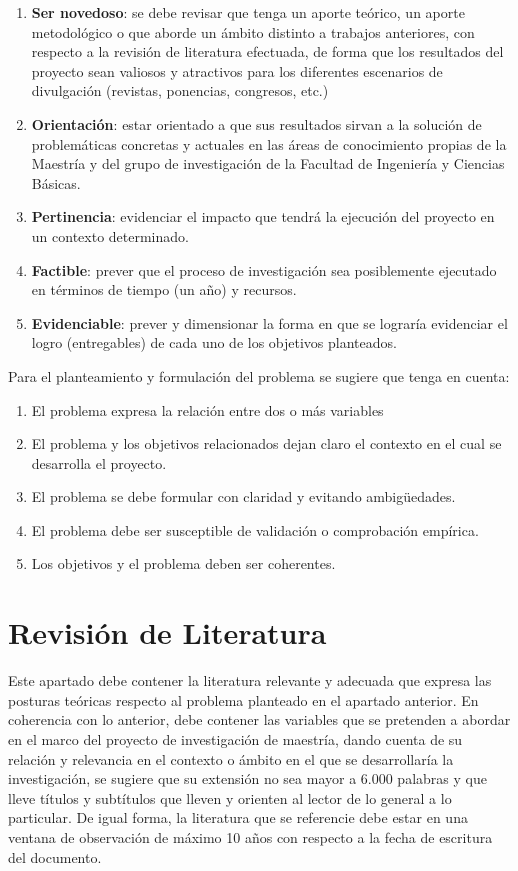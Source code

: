 \documentclass[spanish, 12pt, letterpaper]{poli}
\begin{document}
\begin{enumerate}
	\item \textbf{Ser novedoso}: se debe revisar que tenga un aporte teórico, un aporte metodológico o que aborde un ámbito distinto a trabajos anteriores, con respecto a la revisión de literatura efectuada, de forma que los resultados del proyecto sean valiosos y atractivos para los diferentes escenarios de divulgación (revistas, ponencias, congresos, etc.)
	\item \textbf{Orientación}: estar orientado a que sus resultados sirvan a la solución de problemáticas concretas y actuales en las áreas de conocimiento propias de la Maestría y del grupo de investigación de la Facultad de Ingeniería y Ciencias Básicas.
	\item \textbf{Pertinencia}: evidenciar el impacto que tendrá la ejecución del proyecto en un contexto determinado.
	\item \textbf{Factible}: prever que el proceso de investigación sea posiblemente ejecutado en términos de tiempo (un año) y recursos.
	\item \textbf{Evidenciable}: prever y dimensionar la forma en que se lograría evidenciar el logro (entregables) de cada uno de los objetivos planteados.
\end{enumerate}

Para el planteamiento y formulación del problema se sugiere que tenga en cuenta:
\begin{enumerate}
	\item El problema expresa la relación entre dos o más variables
	\item El problema y los objetivos relacionados dejan claro el contexto en el cual se desarrolla el proyecto.
	\item El problema se debe formular con claridad y evitando ambigüedades.
	\item El problema debe ser susceptible de validación o comprobación empírica.
	\item Los objetivos y el problema deben ser coherentes.
\end{enumerate}


\section{Revisión de Literatura}
Este apartado debe contener la literatura relevante y adecuada que expresa las posturas teóricas respecto al problema planteado en el apartado anterior. En coherencia con lo anterior, debe contener las variables que se pretenden a abordar en el marco del proyecto de investigación de maestría, dando cuenta de su relación y relevancia en el contexto o ámbito en el que se desarrollaría la investigación, se sugiere que su extensión no sea mayor a 6.000 palabras y que lleve títulos y subtítulos que lleven y orienten al lector de lo general a lo particular. De igual forma, la literatura que se referencie debe estar en una ventana de observación de máximo 10 años con respecto a la fecha de escritura del documento.
\end{document}
